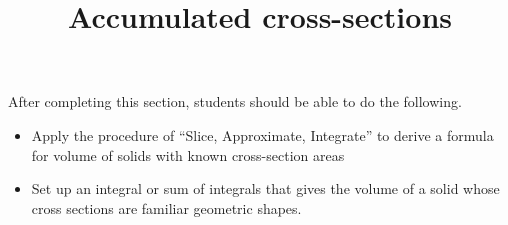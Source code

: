 \documentclass{ximera}
\title{Accumulated cross-sections}
\begin{document}
\begin{abstract}
\end{abstract}

\maketitle

\begin{sectionOutcomes}

After completing this section, students should be able to do the following.

\begin{itemize}
\item Apply the procedure of ``Slice, Approximate, Integrate'' to derive a formula for volume of solids with known cross-section areas
\item Set up an integral or sum of integrals that gives the volume of a solid whose cross sections are familiar geometric shapes.
\end{itemize}

\end{sectionOutcomes}
\end{document}
